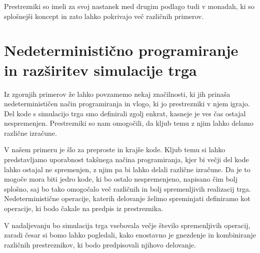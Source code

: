 \documentclass[a4paper,12pt]{article}
\theoremstyle{definition} %
\begin{document}
Prestrezniki so imeli za svoj nastanek med drugim podlago tudi v monadah, ki so splošnejši koncept in zato lahko pokrivajo več različnih primerov. 





\section{Nedeterministično programiranje in razširitev simulacije trga}

Iz zgornjih primerov že lahko povzamemo nekaj značilnosti, ki jih prinaša nedeterminističen način programiranja in vlogo, ki jo prestrezniki v njem igrajo. Del kode s simulacijo trga smo definirali zgolj enkrat, kasneje je ves čas ostajal nespremenjen. Prestrezniki so nam omogočili, da kljub temu z njim lahko delamo različne izračune. 

V našem primeru je šlo za preproste in krajše kode. Kljub temu si lahko predstavljamo uporabnost takšnega načina programiranja, kjer bi večji del kode lahko ostajal ne spremenjen, z njim pa bi lahko delali različne izračune. Da je to mogoče mora biti jedro kode, ki bo ostalo nespremenjeno, napisano čim bolj splošno, saj bo tako omogočalo več različnih in bolj spremenljivih realizacij trga. Nedeterministične operacije, katerih delovanje želimo spreminjati definiramo kot operacije, ki bodo čakale na predpis iz prestreznika.

V nadaljevanju bo simulacija trga vsebovala večje število spremenljivih operacij, zaradi česar si bomo lahko pogledali, kako enostavno je gnezdenje in kombiniranje različnih prestreznikov, ki bodo predpisovali njihovo delovanje.
\end{document}
